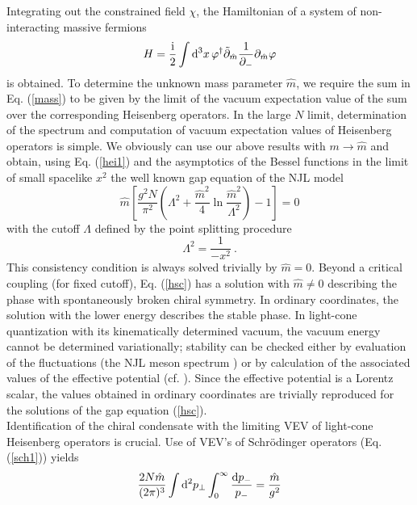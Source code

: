 \documentclass[a4paper,12pt]{article}
\begin{document}
Integrating out the constrained field $\chi$, the Hamiltonian of a system of non-interacting massive
fermions
\begin{equation}
\label{lcha}
H =\frac{{\rm i}}{2}\int {\rm d}^{3} x\,\varphi^{\dagger}\tilde{\partial}_{\hat{m}}\frac{1}
{\partial_{-}}\partial_{\hat{m}}\varphi
\end{equation}
is obtained. To determine the unknown mass parameter $\hat{m}$, we require the sum  in
Eq. (\ref{mass}) to be given by the limit of the vacuum expectation value of the sum over the
corresponding Heisenberg operators.
In the large $N$ limit, determination of the  spectrum and computation of  vacuum expectation
values of Heisenberg operators is simple. We obviously can use our above results with $m
\rightarrow \hat{m}$
and obtain, using Eq. (\ref{hei1}) and the asymptotics of the Bessel functions in the limit of
small spacelike $x^{2}$   the well known  gap equation of the NJL model
\begin{equation}
\label{hsc}
\hat{m}\left[\frac{g^2 N}{\pi^{2}} \left(\Lambda^{2} +\frac{\hat{m}^2}{4}\ln
\frac{\hat{m}^2}{\Lambda^2}\right)-1\right]=0\end{equation}
with  the cutoff $\Lambda$ defined by the point splitting procedure
\begin{displaymath}
\Lambda^2 = \frac{1}{-x^2}\ .
\end{displaymath}
This consistency condition is always solved trivially by $\hat{m}=0$. Beyond a critical coupling
(for fixed cutoff), Eq. (\ref{hsc}) has a solution with $\hat{m} \neq 0$ describing the phase with
spontaneously broken chiral symmetry. In ordinary coordinates, the solution with the lower energy
describes the stable phase. In light-cone quantization with its kinematically determined vacuum, the
vacuum energy cannot be determined variationally; stability can be checked either by evaluation of
the fluctuations (the NJL meson spectrum \cite{LOTY00}) or by calculation of the associated values of
 the effective potential (cf. \cite{MIRA93}). Since the effective potential is a Lorentz scalar, the
values obtained in ordinary coordinates are trivially reproduced for the solutions of the gap equation
(\ref{hsc}).\\
Identification of the chiral condensate with the limiting  VEV of light-cone Heisenberg operators is
crucial. Use of VEV's of Schr\"odinger operators (Eq. (\ref{sch1})) yields
\begin{equation}
  \label{njlv}
\frac{2N\hat{m}}{(2 \pi)^{3}} \int {\rm d}^{2}p_{\perp}
    \int^{\infty}_{0} \frac{{\rm d} p _{-}}{p_{-}}  =  \frac{\hat{m}}{g^2}
\end{equation}
\end{document}

